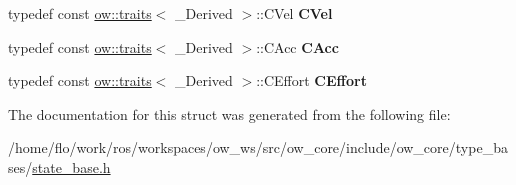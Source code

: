 \begin{DoxyCompactItemize}
\item 
typedef const \hyperlink{structow_1_1traits}{ow\+::traits}$<$ \+\_\+\+Derived $>$\+::C\+Vel {\bfseries C\+Vel}\hypertarget{structow__core_1_1StateBaseTraits_3_01__Derived_00_011_01_4_a69bbe42cbab1c5084302eab0879e93bb}{}\label{structow__core_1_1StateBaseTraits_3_01__Derived_00_011_01_4_a69bbe42cbab1c5084302eab0879e93bb}

\item 
typedef const \hyperlink{structow_1_1traits}{ow\+::traits}$<$ \+\_\+\+Derived $>$\+::C\+Acc {\bfseries C\+Acc}\hypertarget{structow__core_1_1StateBaseTraits_3_01__Derived_00_011_01_4_aabb5aef64f8edf3db3a926d0bb35d3bf}{}\label{structow__core_1_1StateBaseTraits_3_01__Derived_00_011_01_4_aabb5aef64f8edf3db3a926d0bb35d3bf}

\item 
typedef const \hyperlink{structow_1_1traits}{ow\+::traits}$<$ \+\_\+\+Derived $>$\+::C\+Effort {\bfseries C\+Effort}\hypertarget{structow__core_1_1StateBaseTraits_3_01__Derived_00_011_01_4_ab1816815935d1a2bdaa6068ef354a112}{}\label{structow__core_1_1StateBaseTraits_3_01__Derived_00_011_01_4_ab1816815935d1a2bdaa6068ef354a112}

\end{DoxyCompactItemize}


The documentation for this struct was generated from the following file\+:\begin{DoxyCompactItemize}
\item 
/home/flo/work/ros/workspaces/ow\+\_\+ws/src/ow\+\_\+core/include/ow\+\_\+core/type\+\_\+bases/\hyperlink{state__base_8h}{state\+\_\+base.\+h}\end{DoxyCompactItemize}

